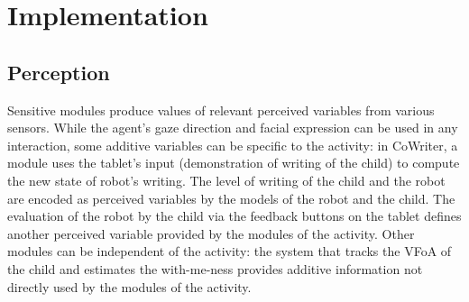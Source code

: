 \documentclass[10pt,a4paper]{article}
\begin{document}

\section{Implementation}\label{arch} 

\subsection{Perception}
\label{ssec:perception}
Sensitive modules produce values of relevant perceived variables from various sensors. 
While the agent's gaze direction and facial expression can be used in any interaction, some additive variables can be specific to the activity: in CoWriter, a module uses the tablet's input (demonstration of writing of the child) to compute the new state of robot's writing. The level of writing of the child and the robot are encoded as perceived variables by the models of the robot and the child.
The evaluation of the robot by the child via the feedback buttons on the tablet defines another perceived variable provided by the modules of the activity. 
Other modules can be independent of the activity: the system that tracks the VFoA of the child and estimates the with-me-ness provides additive information not directly used by the modules of the activity.  
\end{document}
